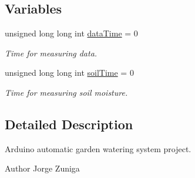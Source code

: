 \subsection*{Variables}
\begin{DoxyCompactItemize}
\item 
unsigned long long int \hyperlink{group__vars_ga8739a36f1280d74b0cdf25a29769cec3}{data\+Time} = 0
\begin{DoxyCompactList}\small\item\em Time for measuring data. \end{DoxyCompactList}\item 
unsigned long long int \hyperlink{group__vars_ga15bdfe0582d8b5793a6c31b9b1b7a4a1}{soil\+Time} = 0
\begin{DoxyCompactList}\small\item\em Time for measuring soil moisture. \end{DoxyCompactList}\end{DoxyCompactItemize}


\subsection{Detailed Description}
Arduino automatic garden watering system project. 

\begin{DoxyAuthor}{Author}
Jorge Zuniga 
\end{DoxyAuthor}
